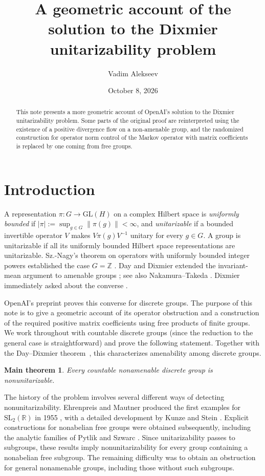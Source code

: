 \documentclass[a4paper,11pt]{amsproc}
\title{A geometric account of the solution to the Dixmier unitarizability problem}
\author{Vadim Alekseev}
\date{October 8, 2026}%
\numberwithin{equation}{section}
\newtheorem*{maintheorem}{Main theorem}
\theoremstyle{definition}
\newcommand{\R}{\mathbb R}
\newcommand{\norm}[1]{\left\lVert#1\right\rVert}
\begin{document}
\begin{abstract}
This note presents a more geometric account of OpenAI's solution to the Dixmier unitarizability problem. Some parts of the original proof are reinterpreted using the existence of a positive divergence flow on a non-amenable group, and the randomized construction for operator norm control of the Markov operator with matrix coefficients is replaced by one coming from free groups.
\end{abstract}
\maketitle\thispagestyle{plain}

\section*{Introduction}
A representation $\pi:G\to\mathrm{GL}(H)$ on a complex Hilbert space is \emph{uniformly bounded} if $|\pi|:=\sup_{g\in G}\norm{\pi(g)}<\infty$, and \emph{unitarizable} if a bounded invertible operator $V$ makes $V\pi(g)V^{-1}$ unitary for every $g\in G$. A group is unitarizable if all its uniformly bounded Hilbert space representations are unitarizable. Sz.-Nagy's theorem on operators with uniformly bounded integer powers established the case $G=\mathbb Z$ \cite{sznagy}. Day and Dixmier extended the invariant-mean argument to amenable groups \cite{day,dixmier}; see also Nakamura--Takeda \cite{nt}. Dixmier immediately asked about the converse \cite[\S\,5]{dixmier}.

OpenAI's preprint \cite{openai} proves this converse for discrete groups. The purpose of this note is to give a geometric account of its operator obstruction and a construction of the required positive matrix coefficients using free products of finite groups. We work throughout with countable discrete groups (since the reduction to the general case is straightforward) and prove the following statement. Together with the Day--Dixmier theorem~\cite{day,dixmier}, this characterizes amenability among discrete groups.

\begin{maintheorem}
Every countable nonamenable discrete group is nonunitarizable.
\end{maintheorem}


The history of the problem involves several different ways of detecting nonunitarizability. Ehrenpreis and Mautner produced the first examples for $\mathrm{SL}_2(\R)$ in 1955 \cite{ehrenpreis}, with a detailed development by Kunze and Stein \cite{ks}. Explicit constructions for nonabelian free groups were obtained subsequently, including the analytic families of Pytlik and Szwarc \cite{ps}. Since unitarizability passes to subgroups, these results imply nonunitarizability for every group containing a nonabelian free subgroup. The remaining difficulty was to obtain an obstruction for general nonamenable groups, including those without such subgroups.
\end{document}

